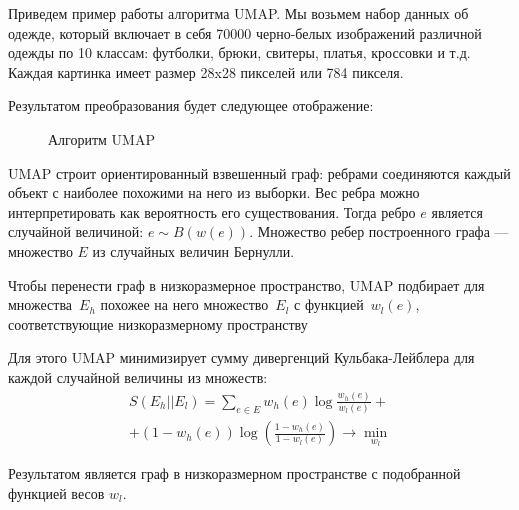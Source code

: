 \documentclass[final]{beamer}
\newlength{\onecolwid}
\begin{document}
\begin{frame}[t]
\begin{columns}[t]
\begin{column}{\onecolwid}
Приведем пример работы алгоритма UMAP. Мы возьмем набор данных об одежде, который включает в себя 70000 черно-белых изображений различной одежды по 10 классам: футболки, брюки, свитеры, платья, кроссовки и т.д. Каждая картинка имеет размер 28x28 пикселей или 784 пикселя.

Результатом преобразования будет следующее отображение:

\begin{figure}[!h]
	\noindent{}
	\caption{Алгоритм UMAP}
	\label{figCurves}
\end{figure} 

UMAP строит ориентированный взвешенный граф: ребрами соединяются каждый объект с наиболее похожими на него из выборки. Вес ребра можно интерпретировать как вероятность его существования. Тогда ребро $e$ является случайной величиной: $e \sim B(w(e))$. Множество ребер построенного графа --- множество $E$ из случайных величин Бернулли.

Чтобы перенести граф в низкоразмерное пространство, UMAP подбирает для множества~$E_h$ похожее на него множество~$E_l$ с функцией~$w_l(e)$, соответствующие низкоразмерному пространству

Для этого UMAP минимизирует сумму дивергенций Кульбака-Лейблера для каждой случайной величины из множеств:
\begin{multline*}
	S(E_h||E_l) = \sum_{e \in E} w_h(e) \log \frac{w_h(e)}{w_l(e)} + \\ + (1 - w_h(e)) \log \left(\frac{1 - w_h(e)}{1 - w_l(e)}\right) \rightarrow \min_{w_l}
\end{multline*}

Результатом является граф в низкоразмерном пространстве с подобранной функцией весов $w_l$.


\end{column}
\end{columns}
\end{frame}
\end{document}
